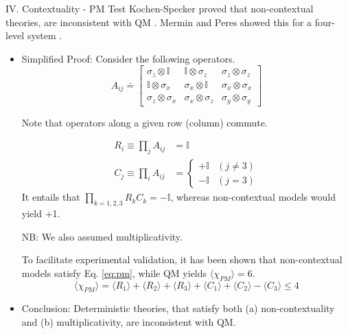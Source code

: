 \documentclass[final,hyperref={pdfpagelabels=false}]{beamer}
\newcommand{\mean}[1]{\langle #1 \rangle}
\begin{document}
\begin{frame}[t]
\begin{columns}[c]
\begin{column}{.69\textwidth}
\begin{columns}[c]
\begin{column}{.46\textwidth}
\begin{block}{IV. Contextuality - PM Test}
            Kochen-Specker proved that non-contextual theories, are inconsistent with QM \cite{Koc}. Mermin and Peres showed this for a four-level system \cite{PeresContext}.
            \begin{itemize}
            \item Simplified Proof: Consider the following operators. 
              \[
              A_{ij} \doteq \left[
                \begin{array}{ccc}
                  \sigma_z\otimes \mathbb I &  \mathbb I \otimes \sigma_z & \sigma_z\otimes \sigma_ z \\
                  \mathbb I \otimes \sigma_x &  \sigma_x \otimes \mathbb I & \sigma_x\otimes \sigma_x \\
                  \sigma_z \otimes \sigma_x &  \sigma_x \otimes \sigma_z & \sigma_y\otimes \sigma_y
                \end{array} \right]
              \]


              Note that operators along a given row (column) commute. 
              
              \begin{align}
                R_i\equiv \prod_j A_{ij} & = \mathbb{I} \\
                C_j\equiv \prod_i A_{ij} & = 
                                           \begin{cases} 
                                             +\mathbb{I} &  (j\neq 3)\\
                                             -\mathbb{I} &  (j=3)
                                           \end{cases} 
              \end{align}
              It entails that $\prod_{k=1,2,3}R_kC_k= -\mathbb{I}$, whereas non-contextual models would yield +1.

              NB: We also assumed multiplicativity. 

              To facilitate experimental validation, it has been shown that non-contextual models satisfy Eq. \ref{eq:pm}, while QM yields $\mean{\chi_{PM}}=6$.
              \begin{equation}
                \mean{\chi_{PM}} = \mean{R_1} + \mean{R_2} + \mean{R_3} + \mean{C_1} + \mean{C_2} - \mean{C_3} \le 4
                \label{eq:pm}
              \end{equation}

            \item Conclusion: Deterministic theories, that satisfy both (a) non-contextuality and (b) multiplicativity, are inconsistent with QM.
            \end{itemize}


\end{block}
\end{column}
\end{columns}
\end{column}
\end{columns}
\end{frame}
\end{document}

